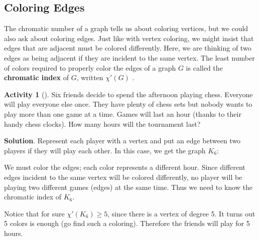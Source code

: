 \documentclass[10pt,]{book}
\newcommand{\terminology}[1]{\textbf{#1}}
\theoremstyle{plain}
\theoremstyle{definition}
\theoremstyle{definition}
\theoremstyle{definition}
\newtheorem{activity}[project]{Activity}
\numberwithin{equation}{chapter}
\newcommand{\vtx}[2]{node[fill,circle,inner sep=0pt, minimum size=4pt,label=#1:#2]{}}
\renewcommand{\v}{\vtx{above}{}}
\begin{document}
\subsection[{Coloring Edges}]{Coloring Edges}\label{subsection-10}
\hypertarget{p-400}{}%
The chromatic number of a graph tells us about coloring vertices, but we could also ask about coloring edges. Just like with vertex coloring, we might insist that edges that are adjacent must be colored differently. Here, we are thinking of two edges as being adjacent if they are incident to the same vertex. The least number of colors required to properly color the edges of a graph \(G\) is called the \terminology{chromatic index} of \(G\), written \(\chi'(G)\)\label{notation-7}
.%
\begin{activity}[]\label{activity-40}
\hypertarget{p-401}{}%
Six friends decide to spend the afternoon playing chess. Everyone will play everyone else once. They have plenty of chess sets but nobody wants to play more than one game at a time. Games will last an hour (thanks to their handy chess clocks). How many hours will the tournament last?%
\par\smallskip%
\noindent\textbf{Solution}.\hypertarget{solution-28}{}\quad%
\hypertarget{p-402}{}%
Represent each player with a vertex and put an edge between two players if they will play each other. In this case, we get the graph \(K_6\):%
\begin{sidebyside}{1}{0.4}{0.4}{0}
\begin{sbspanel}{0.2}
\resizebox{\linewidth}{!}{{
\begin{tikzpicture}
	\foreach \x in {0,...,5}{

		\foreach \y in {1,...,5}{
		 \draw (\x*60:1) -- (\x*60+\y*60:1);
		}
	\draw (\x*60:1) \v;
	}
	\end{tikzpicture}
}
}
\end{sbspanel}
\end{sidebyside}
\par
\hypertarget{p-403}{}%
We must color the edges; each color represents a different hour. Since different edges incident to the same vertex will be colored differently, no player will be playing two different games (edges) at the same time. Thus we need to know the chromatic index of \(K_6\).%
\par
\hypertarget{p-404}{}%
Notice that for sure \(\chi'(K_6) \ge 5\), since there is a vertex of degree 5. It turns out 5 colors is enough (go find such a coloring). Therefore the friends will play for 5 hours.%
\end{activity}
\end{document}
